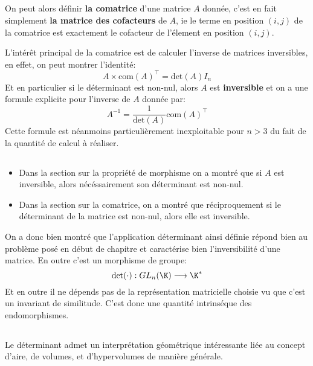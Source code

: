 \subsection*{}

On peut alors définir \textbf{la comatrice} d'une matrice \(A\) donnée, c'est en fait simplement \textbf{la matrice des cofacteurs} de \(A\), ie le terme en position \((i, j)\) de la comatrice est exactement le cofacteur de l'élement en position \((i, j)\). \<

L'intérêt principal de la comatrice est de calculer l'inverse de matrices inversibles, en effet, on peut montrer l'identité:
\[
   A \times \text{com}(A)^{\top} = \text{det}(A)I_n   
\]
Et en particulier si le déterminant est non-nul, alors \( A \) est \textbf{inversible} et on a une formule explicite pour l'inverse de \( A \) donnée par:
\[ 
   A^{-1} = \frac{1}{\text{det}(A)}\text{com}(A)^{\top}  
\]
Cette formule est néanmoins particulièrement inexploitable pour \(n > 3\) du fait de la quantité de calcul à réaliser.
\subsection*{}
\begin{itemize}
   \item Dans la section sur la propriété de morphisme on a montré que si \( A \) est inversible, alors nécéssairement son déterminant est non-nul. 
   \item Dans la section sur la comatrice, on a montré que réciproquement si le déterminant de la matrice est non-nul, alors elle est inversible.
\end{itemize}
On a donc bien montré que l'application déterminant ainsi définie répond bien au problème posé en début de chapitre et caractérise bien l'inversibilité d'une matrice. En outre c'est un morphisme de groupe: 
\[ 
   \text{det}( \cdot) : GL_n( \K) \longrightarrow \K^*
\]
Et en outre il ne dépends pas de la représentation matricielle choisie vu que c'est un invariant de similitude. C'est donc une quantité intrinséque des endomorphismes.
\subsection*{}

Le déterminant admet un interprétation géométrique intéressante liée au concept d'aire, de volumes, et d'hypervolumes de manière générale. \<

